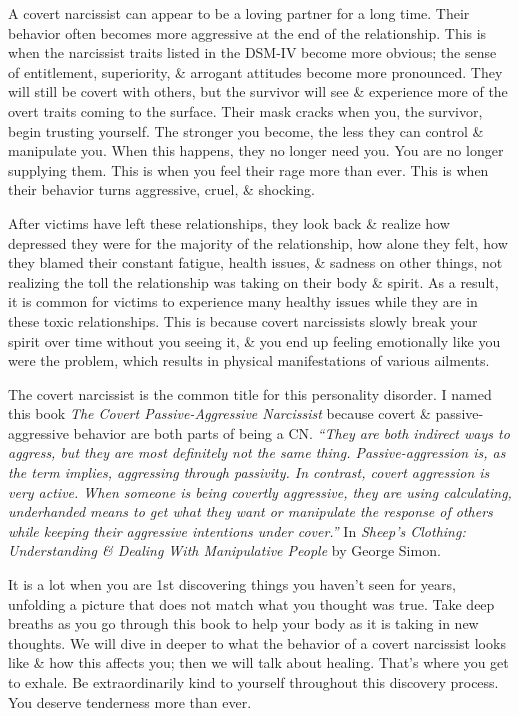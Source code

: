 \documentclass{article}
\numberwithin{equation}{section}
\begin{document}
A covert narcissist can appear to be a loving partner for a long time. Their behavior often becomes more aggressive at the end of the relationship. This is when the narcissist traits listed in the DSM-IV become more obvious; the sense of entitlement, superiority, \& arrogant attitudes become more pronounced. They will still be covert with others, but the survivor will see \& experience more of the overt traits coming to the surface. Their mask cracks when you, the survivor, begin trusting yourself. The stronger you become, the less they can control \& manipulate you. When this happens, they no longer need you. You are no longer supplying them. This is when you feel their rage more than ever. This is when their behavior turns aggressive, cruel, \& shocking.

After victims have left these relationships, they look back \& realize how depressed they were for the majority of the relationship, how alone they felt, how they blamed their constant fatigue, health issues, \& sadness on other things, not realizing the toll the relationship was taking on their body \& spirit. As a result, it is common for victims to experience many healthy issues while they are in these toxic relationships. This is because covert narcissists slowly break your spirit over time without you seeing it, \& you end up feeling emotionally like you were the problem, which results in physical manifestations of various ailments.

The covert narcissist is the common title for this personality disorder. I named this book \textit{The Covert Passive-Aggressive Narcissist} because covert \& passive-aggressive behavior are both parts of being a CN. \textit{``They are both indirect ways to aggress, but they are most definitely not the same thing. Passive-aggression is, as the term implies, aggressing through passivity. In contrast, covert aggression is very active. When someone is being covertly aggressive, they are using calculating, underhanded means to get what they want or manipulate the response of others while keeping their aggressive intentions under cover.''} In \textit{Sheep's Clothing: Understanding \& Dealing With Manipulative People} by George Simon.

It is a lot when you are 1st discovering things you haven't seen for years, unfolding a picture that does not match what you thought was true. Take deep breaths as you go through this book to help your body as it is taking in new thoughts. We will dive in deeper to what the behavior of a covert narcissist looks like \& how this affects you; then we will talk about healing. That's where you get to exhale. Be extraordinarily kind to yourself throughout this discovery process. You deserve tenderness more than ever.
\end{document}
